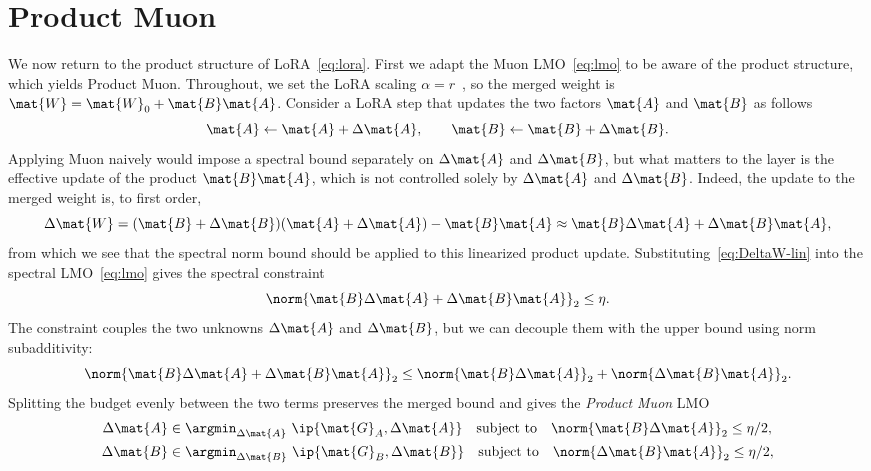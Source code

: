 \section{Product Muon}\label{sec:product-muon}

We now return to the product structure of LoRA~\eqref{eq:lora}. First we adapt the Muon LMO~\eqref{eq:lmo} to be aware of the product structure, which yields Product Muon. 
Throughout, we set the LoRA scaling $\alpha=r$~\cite{loralearnsless, raschka}, so the merged weight is $\mat{W} = \mat{W}_0 + \mat{B}\mat{A}$. Consider a LoRA step that updates the two factors $\mat{A}$ and $\mat{B}$ as follows
\[
\mat{A} \leftarrow \mat{A} + \Delta\mat{A},
\qquad
\mat{B} \leftarrow \mat{B} + \Delta\mat{B}.
\]
Applying Muon naively would impose a spectral bound separately on $\Delta\mat{A}$ and $\Delta\mat{B}$, but what matters to the layer is the effective update of the product $\mat{B}\mat{A}$, which is not controlled solely by $\Delta\mat{A}$ and $\Delta\mat{B}$. Indeed, the update to the merged weight is, to first order,
\begin{equation} \label{eq:DeltaW-lin}
\Delta\mat{W} = (\mat{B} + \Delta\mat{B})(\mat{A} + \Delta\mat{A}) - \mat{B}\mat{A} \approx \mat{B} \Delta\mat{A} + \Delta\mat{B} \mat{A},
\end{equation}
from which we see that the spectral norm bound should be applied to this linearized product update. Substituting~\eqref{eq:DeltaW-lin} into the spectral LMO~\eqref{eq:lmo} gives the spectral constraint
\[
\norm{\mat{B} \Delta\mat{A} + \Delta\mat{B} \mat{A}}_2
\le \eta.
\]
The constraint couples the two unknowns $\Delta\mat{A}$ and $\Delta\mat{B}$, but we can decouple them with the upper bound using norm subadditivity:
\[
\norm{\mat{B} \Delta\mat{A} + \Delta\mat{B} \mat{A}}_2
\le
\norm{\mat{B} \Delta\mat{A}}_2 + \norm{\Delta\mat{B} \mat{A}}_2.
\]
Splitting the budget evenly between the two terms preserves the merged bound and gives the \emph{Product Muon} LMO
\begin{equation}
  \begin{aligned}
  \Delta\mat{A} &\in \argmin_{\Delta\mat{A}}~ \ip{\mat{G}_A, \Delta\mat{A}}
  \quad \textnormal{subject to}\quad
  \norm{\mat{B} \Delta\mat{A}}_2\le\eta/2, \\
  \Delta\mat{B} &\in \argmin_{\Delta\mat{B}}~ \ip{\mat{G}_B, \Delta\mat{B}}
  \quad \textnormal{subject to}\quad
  \norm{\Delta\mat{B} \mat{A}}_2\le\eta/2,
  \end{aligned}
  \label{eq:decoupled-lora-lmo}
\end{equation}
